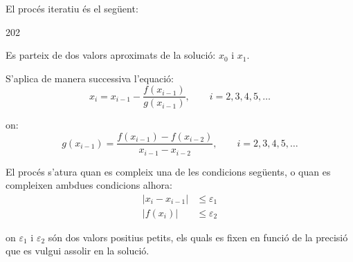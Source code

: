 \begin{center}
    
    \label{pic:metode-secant}
\end{center}


El procés iteratiu és el següent:

\begin{dingautolist}{202}
    \item Es parteix de dos valors aproximats de la solució: $x_0$ i $x_1$.

    \item   S'aplica de manera successiva l'equació:
            \begin{equation}\label{eq:secant-1}
              x_i = x_{i-1} - \frac{f(x_{i-1})}{g(x_{i-1})}, \qquad i=2,3,4,5, \dots
            \end{equation}

            on:
            \begin{equation}\label{eq:secant-2}
              g(x_{i-1}) = \frac{f(x_{i-1}) - f(x_{i-2}) } {x_{i-1} - x_{i-2}}, \qquad i=2,3,4, 5, \dots
            \end{equation}

    \item   El procés s'atura quan es compleix una de les condicions següents, o quan es compleixen ambdues condicions alhora:
            \begin{subequations}\begin{align}
              |x_i - x_{i-1}| &\leq \varepsilon_1 \\
              |f(x_i)| &\leq \varepsilon_2
            \end{align}\end{subequations}

            on $\varepsilon_1$ i $\varepsilon_2$ són dos valors positius petits, els quals es fixen en funció de la precisió que es vulgui assolir en la solució.
\end{dingautolist}


